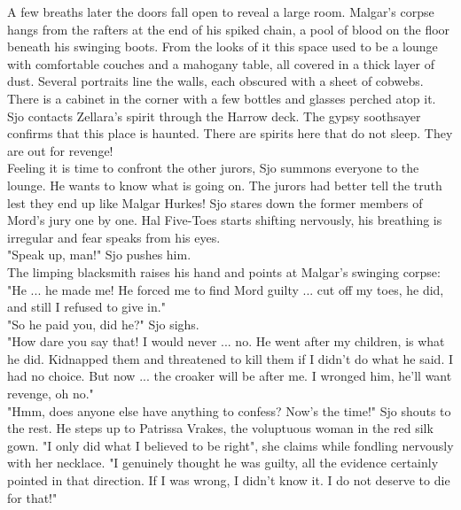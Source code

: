A few breaths later the doors fall open to reveal a large room. Malgar's corpse hangs from the rafters at the end of his spiked chain, a pool of blood on the floor beneath his swinging boots. From the looks of it this space used to be a lounge with comfortable couches and a mahogany table, all covered in a thick layer of dust. Several portraits line the walls, each obscured with a sheet of cobwebs. There is a cabinet in the corner with a few bottles and glasses perched atop it.\\

Sjo contacts Zellara's spirit through the Harrow deck. The gypsy soothsayer confirms that this place is haunted. There are spirits here that do not sleep. They are out for revenge!\\

Feeling it is time to confront the other jurors, Sjo summons everyone to the lounge. He wants to know what is going on. The jurors had better tell the truth lest they end up like Malgar Hurkes! Sjo stares down the former members of Mord's jury one by one. Hal Five-Toes starts shifting nervously, his breathing is irregular and fear speaks from his eyes.\\

"Speak up, man!" Sjo pushes him.\\

The limping blacksmith raises his hand and points at Malgar's swinging corpse: "He ... he made me! He forced me to find Mord guilty ... cut off my toes, he did, and still I refused to give in."\\

"So he paid you, did he?" Sjo sighs.\\

"How dare you say that! I would never ... no. He went after my children, is what he did. Kidnapped them and threatened to kill them if I didn't do what he said. I had no choice. But now ... the croaker will be after me. I wronged him, he'll want revenge, oh no."\\

"Hmm, does anyone else have anything to confess? Now's the time!" Sjo shouts to the rest. He steps up to Patrissa Vrakes, the voluptuous woman in the red silk gown. "I only did what I believed to be right", she claims while fondling nervously with her necklace. "I genuinely thought he was guilty, all the evidence certainly pointed in that direction. If I was wrong, I didn't know it. I do not deserve to die for that!"\\

